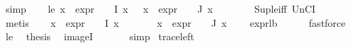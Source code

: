 \begin{isabellebody}
\ simp\isanewline
\ \ \isamarkupfalse%
\ le{\isacharunderscore}{\kern0pt}{}{\isacharcolon}{\kern0pt}\ {\isachardoublequoteopen}{\isasymforall}x\ {\isasymin}\ {\isacharparenleft}{\kern0pt}{\isacharparenleft}{\kern0pt}expr{\isacharunderscore}{\kern0pt}{}\ {\isasymcirc}\ {\isasymPhi}{\isacharparenright}{\kern0pt}\ {\isacharbackquote}{\kern0pt}\ I{\isacharparenright}{\kern0pt}{\isachardot}{\kern0pt}\ x\ {\isasymle}\ {}{\isachardoublequoteclose}\ {\isachardoublequoteopen}{\isasymforall}x\ {\isasymin}\ {\isacharparenleft}{\kern0pt}{\isacharparenleft}{\kern0pt}expr{\isacharunderscore}{\kern0pt}{}\ {\isasymcirc}\ {\isasymPhi}{\isacharparenright}{\kern0pt}\ {\isacharbackquote}{\kern0pt}\ J{\isacharparenright}{\kern0pt}{\isachardot}{\kern0pt}\ x\ {\isasymle}\ {}{\isachardoublequoteclose}\isanewline
\ \ \ \ \isamarkupfalse%
\ Sup{\isacharunderscore}{\kern0pt}le{\isacharunderscore}{\kern0pt}iff\ UnCI\isanewline
\ \ \ \ \isamarkupfalse%
\ metis{\isacharplus}{\kern0pt}\isanewline
\ \ \isamarkupfalse%
\ {\isachardoublequoteopen}{\isasymforall}x\ {\isasymin}\ {\isacharparenleft}{\kern0pt}{\isacharparenleft}{\kern0pt}expr{\isacharunderscore}{\kern0pt}{}\ {\isasymcirc}\ {\isasymPhi}{\isacharparenright}{\kern0pt}\ {\isacharbackquote}{\kern0pt}\ I{\isacharparenright}{\kern0pt}{\isachardot}{\kern0pt}\ x\ {\isasymge}\ {}{\isachardoublequoteclose}\ \isanewline
\ \ \ \ {\isachardoublequoteopen}{\isasymforall}x\ {\isasymin}\ {\isacharparenleft}{\kern0pt}{\isacharparenleft}{\kern0pt}expr{\isacharunderscore}{\kern0pt}{}\ {\isasymcirc}\ {\isasymPhi}{\isacharparenright}{\kern0pt}\ {\isacharbackquote}{\kern0pt}\ J{\isacharparenright}{\kern0pt}{\isachardot}{\kern0pt}\ x\ {\isasymge}\ {}{\isachardoublequoteclose}\ \isamarkupfalse%
\ expr{\isacharunderscore}{\kern0pt}{}{\isacharunderscore}{\kern0pt}lb\isanewline
\ \ \ \ \isamarkupfalse%
\ fastforce{\isacharplus}{\kern0pt}\isanewline
\ \ \isamarkupfalse%
\ le{\isacharunderscore}{\kern0pt}{}\ \isamarkupfalse%
\ {\isacharquery}{\kern0pt}thesis\ \isamarkupfalse%
\ imageI\ \isanewline
\ \ \ \ \isamarkupfalse%
\ simp\isanewline
{}\isamarkupfalse%
%
\endisatagproof
{\isafoldproof}%
%
\isadelimproof
\isanewline
%
\endisadelimproof
\isanewline
{}\isamarkupfalse%
\ trace{\isacharunderscore}{\kern0pt}left{\isacharcolon}{\kern0pt}\isanewline

\end{isabellebody}
